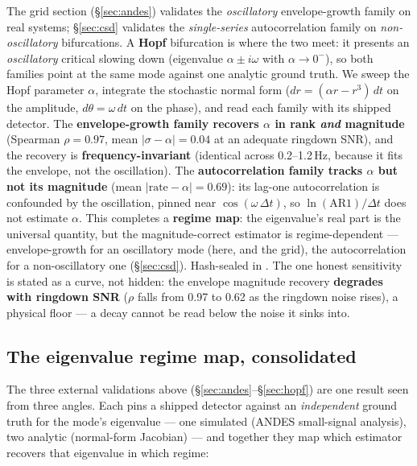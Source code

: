 \documentclass[11pt]{article}
\begin{document}
The grid section (\S\ref{sec:andes}) validates the \emph{oscillatory}
envelope-growth family on real systems; \S\ref{sec:csd} validates the
\emph{single-series} autocorrelation family on \emph{non-oscillatory}
bifurcations. A \textbf{Hopf} bifurcation is where the two meet: it
presents an \emph{oscillatory} critical slowing down (eigenvalue
$\alpha \pm i\omega$ with $\alpha \to 0^{-}$), so both families point at
the same mode against one analytic ground truth. We sweep the Hopf
parameter $\alpha$, integrate the stochastic normal form
($dr = (\alpha r - r^3)\,dt$ on the amplitude, $d\theta = \omega\,dt$ on
the phase), and read each family with its shipped detector. The
\textbf{envelope-growth family recovers $\alpha$ in rank \emph{and}
magnitude} (Spearman $\rho = 0.97$, mean $|\sigma - \alpha| = 0.04$ at
an adequate ringdown SNR), and the recovery is
\textbf{frequency-invariant} (identical across 0.2--1.2\,Hz, because it
fits the envelope, not the oscillation). The \textbf{autocorrelation
family tracks $\alpha$ but not its magnitude} (mean
$|\mathrm{rate} - \alpha| = 0.69$): its lag-one autocorrelation is
confounded by the oscillation, pinned near $\cos(\omega \, \Delta t)$,
so $\ln(\mathrm{AR1})/\Delta t$ does not estimate $\alpha$. This
completes a \textbf{regime map}: the eigenvalue's real part is the
universal quantity, but the magnitude-correct estimator is
regime-dependent --- envelope-growth for an oscillatory mode (here, and
the grid), the autocorrelation for a non-oscillatory one
(\S\ref{sec:csd}). Hash-sealed in
.
The one honest sensitivity is stated as a curve, not hidden: the
envelope magnitude recovery \textbf{degrades with ringdown SNR} ($\rho$
falls from 0.97 to 0.62 as the ringdown noise rises), a physical floor
--- a decay cannot be read below the noise it sinks into.

\subsection{The eigenvalue regime map, consolidated}\label{sec:regimemap}

The three external validations above
(\S\ref{sec:andes}--\S\ref{sec:hopf}) are one result seen from three
angles. Each pins a shipped detector against an \emph{independent}
ground truth for the mode's eigenvalue --- one simulated (ANDES
small-signal analysis), two analytic (normal-form Jacobian) --- and
together they map which estimator recovers that eigenvalue in which
regime:
\end{document}
